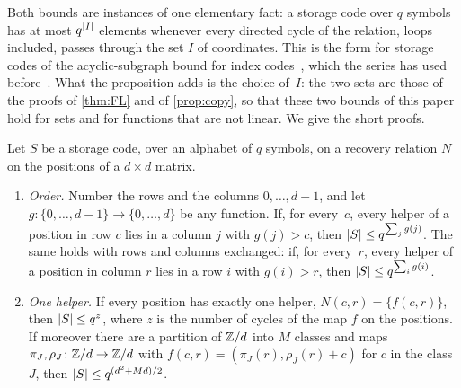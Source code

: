 Both bounds are instances of one elementary fact: a storage code over $q$ symbols has at most $q^{\lvert I \rvert}$ elements
whenever every directed cycle of the relation, loops included, passes through the set $I$ of coordinates. This is
the form for storage codes of the acyclic-subgraph bound for index codes~\cite[Theorem~3]{BBJK2011}, which the series
has used before~\cite[Proposition~4.14(a)]{FourthPaper2026}. What the proposition adds is the choice of~$I$: the two
sets are those of the proofs of \cref{thm:FL} and of \cref{prop:copy}, so that these two bounds of this paper hold
for sets and for functions that are not linear. We give the short proofs.

\begin{proposition}\label{prop:sets}
\notformalized
Let $S$ be a storage code, over an alphabet of $q$ symbols, on a recovery relation $N$ on the positions of a
$d\times d$ matrix.
\begin{enumerate}[label=(\alph*),leftmargin=2em]
\item \emph{Order.} Number the rows and the columns $0,\dots,d-1$, and let $g\colon\{0,\dots,d-1\}\to\{0,\dots,d\}$ be
any function. If, for every~$c$, every helper of a position in row $c$ lies in a column $j$ with $g(j)>c$, then
$\lvert S \rvert\le q^{\sum_jg(j)}$. The same holds with rows and columns exchanged: if, for every~$r$, every helper of a
position in column $r$ lies in a row $i$ with $g(i)>r$, then $\lvert S \rvert\le q^{\sum_ig(i)}$.
\item \emph{One helper.} If every position has exactly one helper, $N(c,r)=\{f(c,r)\}$, then $\lvert S \rvert\le q^{z}$, where
$z$ is the number of cycles of the map $f$ on the positions. If moreover there are a partition of $\mathbb{Z}/d$ into $M$
classes and maps $\pi_J,\rho_J\colon\mathbb{Z}/d\to\mathbb{Z}/d$ with $f(c,r)=(\pi_J(r),\rho_J(r)+c)$ for $c$ in the class~$J$,
then $\lvert S \rvert\le q^{(d^2+Md)/2}$.
\end{enumerate}
\end{proposition}

